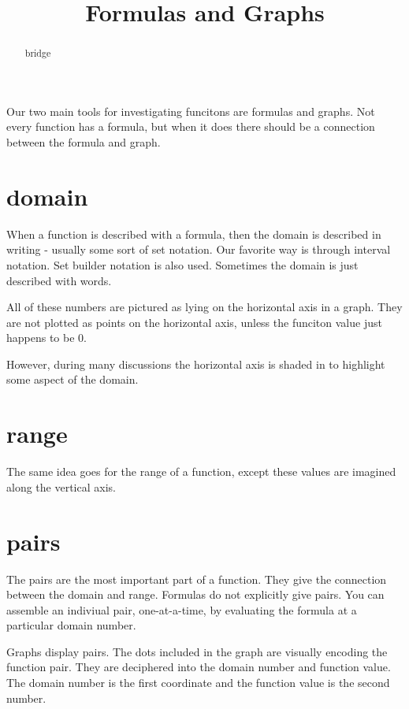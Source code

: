 \documentclass{ximera}
\title{Formulas and Graphs}
\begin{document}
\begin{abstract}
bridge
\end{abstract}
\maketitle



Our two main tools for investigating funcitons are formulas and graphs. Not every function has a formula, but when it does there should be a connection between the formula and graph.

\section{domain}
When a function is described with a formula, then the domain is described in writing - usually some sort of set notation.  Our favorite way is through interval notation.  Set builder notation is also used.  Sometimes the domain is just described with words.

All of these numbers are pictured as lying on the horizontal axis in a graph.  They are not plotted as points on the horizontal axis, unless the funciton value just happens to be $0$.

However, during many discussions the horizontal axis is shaded in to highlight some aspect of the domain.







\section{range}
The same idea goes for the range of a function, except these values are imagined along the vertical axis.








\section{pairs}
The pairs are the most important part of a function.  They give the connection between the domain and range.  Formulas do not explicitly give pairs. You can assemble an indiviual pair, one-at-a-time, by evaluating the formula at a particular domain number.

Graphs display pairs.  The dots included in the graph are visually encoding the function pair.  They are deciphered into the domain number and function value. The domain number is the first coordinate and the function value is the second number.
\end{document}

